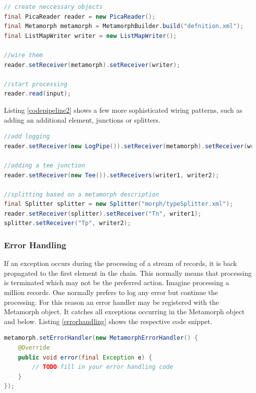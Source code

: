 \documentclass[12pt,a4paper]{article}
\begin{document}
\begin{lstlisting}[float=htb, label=codepipeline1,caption= Putting together a processing pipeline according to the pattern in section \ref{pipeline}., language=Java]
// create neccessary objects
final PicaReader reader = new PicaReader();
final Metamorph metamorph = MetamorphBuilder.build("defnition.xml");
final ListMapWriter writer = new ListMapWriter();

//wire them
reader.setReceiver(metamorph).setReceiver(writer);

//start processing
reader.read(input);

\end{lstlisting}

Listing \ref{codepipeline2} shows a few more sophisticated wiring patterns, such as adding an additional element, junctions or splitters.

\begin{lstlisting}[float=htb, label=codepipeline2,caption= Advanced wiring., language=Java]
//add logging
reader.setReceiver(new LogPipe()).setReceiver(metamorph).setReceiver(writer);

//adding a tee junction
reader.setReceiver(new Tee()).setReceivers(writer1, writer2);

//splitting based on a metamorph description
final Splitter splitter = new Splitter("morph/typeSplitter.xml");
reader.setReceiver(splitter).setReceiver("Tn", writer1);
splitter.setReceiver("Tp", writer2);
\end{lstlisting}


\subsubsection{Error Handling}
If an exception occurs during the processing of a stream of records, it is back propagated to the first element in the chain. This normally means that processing is terminated which may not be the preferred action. Imagine processing a million records. One normally prefers to log any error but continue the processing.
For this reason an error handler may be registered with the Metamorph object. It catches all exceptions occurring in the Metamorph object and below. Listing \ref{errorhandling} shows the respective code snippet.  
\begin{lstlisting}[float=htb, label=errorhandling,caption= Registering an error handler., language=Java]
metamorph.setErrorHandler(new MetamorphErrorHandler() {
	@Override
	public void error(final Exception e) {
		// TODO fill in your error handling code
	}
});
\end{lstlisting}
\end{document}
